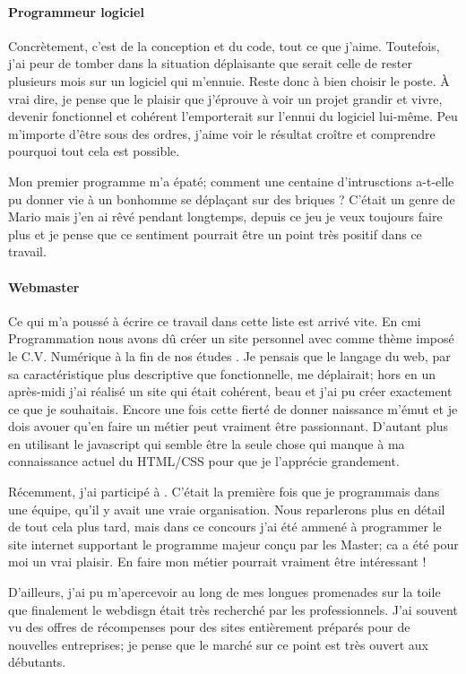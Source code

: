 \documentclass[12pt, a4paper]{report} %
\begin{document}
\paragraph{Programmeur logiciel}
Concrètement, c'est de la conception et du code, tout ce que j'aime. Toutefois, j'ai peur de tomber dans la situation déplaisante que serait celle de rester plusieurs mois sur un logiciel qui m'ennuie. Reste donc à bien choisir le poste. \`A vrai dire, je pense que le plaisir que j'éprouve à voir un projet grandir et vivre, devenir fonctionnel et cohérent l'emporterait sur l'ennui du logiciel lui-même. Peu m'importe d'être sous des ordres, j'aime voir le résultat croître et comprendre pourquoi tout cela est possible. 

Mon premier programme \small{\emph{}} m'a épaté; comment une centaine d'intrusctions a-t-elle pu donner vie à un bonhomme se déplaçant sur des briques ? C'était un genre de Mario mais j'en ai rêvé pendant longtemps, depuis ce jeu je veux toujours faire plus et je pense que ce sentiment pourrait être un point très positif dans ce travail.

\paragraph{Webmaster}
Ce qui m'a poussé à écrire ce travail dans cette liste est arrivé vite. En \acrshort{cmi} Programmation nous avons dû créer un site personnel avec comme thème imposé le \og C.V. Numérique à la fin de nos études \fg. Je pensais que le langage du web, par sa caractéristique plus descriptive que fonctionnelle, me déplairait; hors en un après-midi j'ai réalisé un site qui était cohérent, beau et j'ai pu créer exactement ce que je souhaitais. Encore une fois cette fierté de donner naissance m'émut et je dois avouer qu'en faire un métier peut vraiment être passionnant. D'autant plus en utilisant le javascript qui semble être la seule chose qui manque à ma connaissance actuel du HTML/CSS pour que je l'apprécie grandement.

Récemment, j'ai participé à \og \lni \fg . C'était la première fois que je programmais dans une équipe, qu'il y avait une vraie organisation. Nous reparlerons plus en détail de tout cela plus tard, mais dans ce concours j'ai été ammené à programmer le site internet supportant le programme majeur conçu par les Master; ca a été pour moi un vrai plaisir. En faire mon métier pourrait vraiment être intéressant !

D'ailleurs, j'ai pu m'apercevoir au long de mes longues promenades sur la toile que finalement le webdisgn était très recherché par les professionnels. J'ai souvent vu des offres de récompenses pour des sites entièrement préparés pour de nouvelles entreprises; je pense que le marché sur ce point est très ouvert aux débutants. 
\end{document}
